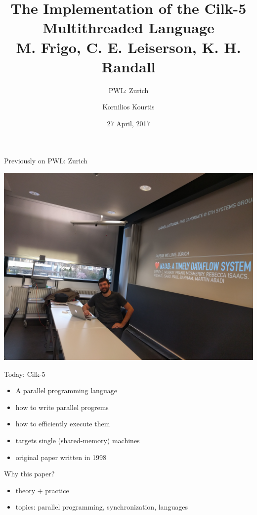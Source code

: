 \documentclass[13pt]{beamer}
\title{{\LARGE The Implementation of the Cilk-5 Multithreaded Language}\\
       \medskip
       M. Frigo, C. E. Leiserson, K. H. Randall
       \medskip
}
\subtitle{\bigskip\Large{}PWL: Zurich}
\author{Kornilios Kourtis}
\date{27 April, 2017}
\begin{document}
\maketitle

\begin{frame}{Previously on PWL: Zurich}
	\begin{center}
	\includegraphics[width=.9\textwidth]{figs/last_time}
	\end{center}
\end{frame}

\begin{frame}{Today: Cilk-5}
\begin{itemize}
    \item A parallel programming language
    \item how to write parallel progrems
    \item how to efficiently execute them
    \item targets single (shared-memory) machines

    \bigskip
    \item original paper written in 1998
\end{itemize}
\end{frame}

\begin{frame}{Why this paper?}{}
\begin{itemize}
\item theory + practice
\item topics: parallel programming, synchronization, languages
\end{itemize}
\end{frame}
\end{document}
